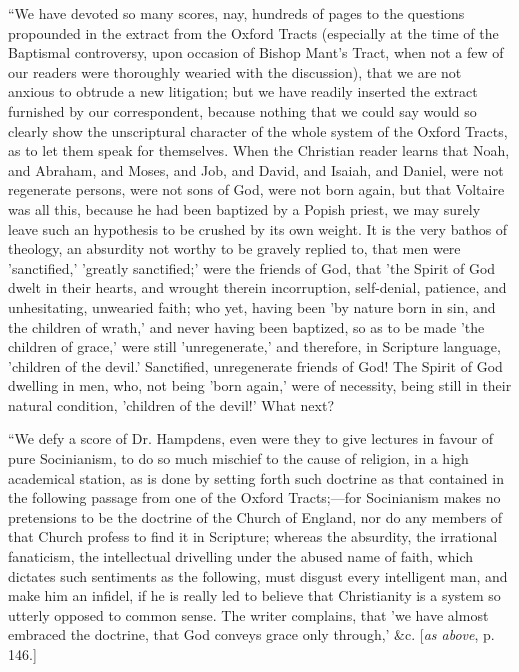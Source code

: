 ``We have devoted so many scores, nay, hundreds of
pages to the questions propounded in the extract from the Oxford
Tracts (especially at the time of the Baptismal controversy, upon
occasion of Bishop Mant's Tract, when not a few of our readers were
thoroughly wearied with the discussion), that we are not anxious to
obtrude a new litigation; but we have readily inserted the extract
furnished by our correspondent, because nothing that we could say
would so clearly show the unscriptural character of the whole system
of the Oxford Tracts, as to let them speak for themselves. When the
Christian reader learns that Noah, and Abraham, and Moses, and Job,
and David, and Isaiah, and Daniel, were not regenerate persons, were
not sons of God, were not born again, but that Voltaire was all this,
because he had been baptized by a Popish priest, we may surely leave
such an hypothesis to be crushed by its own weight. It is the very
bathos of theology, an absurdity not worthy to be gravely replied to,
that men were 'sanctified,' 'greatly sanctified;' were the friends of God, that 'the Spirit of God dwelt in their hearts, and
wrought therein incorruption, self-denial, patience, and unhesitating,
unwearied faith; who yet, having been 'by nature born in sin, and the
children of wrath,' and never having been baptized, so as to be made
'the children of grace,' were still 'unregenerate,' and therefore, in
Scripture language, 'children of the devil.' Sanctified, unregenerate
friends of God! The Spirit of God dwelling in men, who, not being
'born again,' were of necessity, being still in their natural
condition, 'children of the devil!' What next?

``We defy a score of Dr. Hampdens, even were they
to give lectures in favour of pure Socinianism, to do so much mischief
to the cause of religion, in a high academical station, as is done by
setting forth such doctrine as that contained in the following passage
from one of the Oxford Tracts;—for Socinianism makes no pretensions
to be the doctrine of the Church of England, nor do any members of
that Church profess to find it in Scripture; whereas the absurdity,
the irrational fanaticism, the intellectual drivelling under the
abused name of faith, which dictates such sentiments as the following,
must disgust every intelligent man, and make him an infidel, if he is
really led to believe that Christianity is a system so utterly opposed
to common sense. The writer complains, that 'we have almost
embraced the doctrine, that God conveys grace only through,' \&c. [\emph{as
above}, p. 146.]

